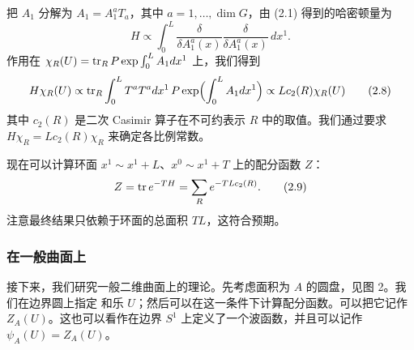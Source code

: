 把 $A_1$ 分解为 $A_1=A_1^aT_a$，其中 $a=1,\dots,\dim G$，由 (2.1) 得到的哈密顿量为
\begin{equation}
  H \propto \int_0^L \frac{\delta}{\delta A_1^a(x)}\frac{\delta}{\delta A_1^a(x)}\,dx^1 .
  \tag{2.7}
\end{equation}
作用在 $\chi_R(U)=\operatorname{tr}_R P\exp\int_0^L A_1dx^1$ 上，我们得到
\begin{equation}
  H\chi_R(U)\propto \operatorname{tr}_R\int_0^L T^aT^a dx^1\,P\exp\Bigl(\int_0^L A_1dx^1\Bigr)
  \propto Lc_2(R)\chi_R(U)
  \tag{2.8}
\end{equation}
其中 $c_2(R)$ 是二次 Casimir 算子在不可约表示 $R$ 中的取值。我们通过要求
$H\chi_R=Lc_2(R)\chi_R$ 来确定各比例常数。

现在可以计算环面 $x^1\sim x^1+L$、$x^0\sim x^1+T$ 上的配分函数 $Z$：
\begin{equation}
  Z=\operatorname{tr} e^{-TH}=\sum_R e^{-TLc_2(R)} .
  \tag{2.9}
\end{equation}
注意最终结果只依赖于环面的总面积 $TL$，这符合预期。

\subsubsection{在一般曲面上}

接下来，我们研究一般二维曲面上的理论。先考虑面积为 $A$ 的圆盘，见图 2。我们在边界圆上指定
和乐 $U$；然后可以在这一条件下计算配分函数。可以把它记作 $Z_A(U)$。这也可以看作在边界
$S^1$ 上定义了一个波函数，并且可以记作 $\psi_A(U)=Z_A(U)$。
